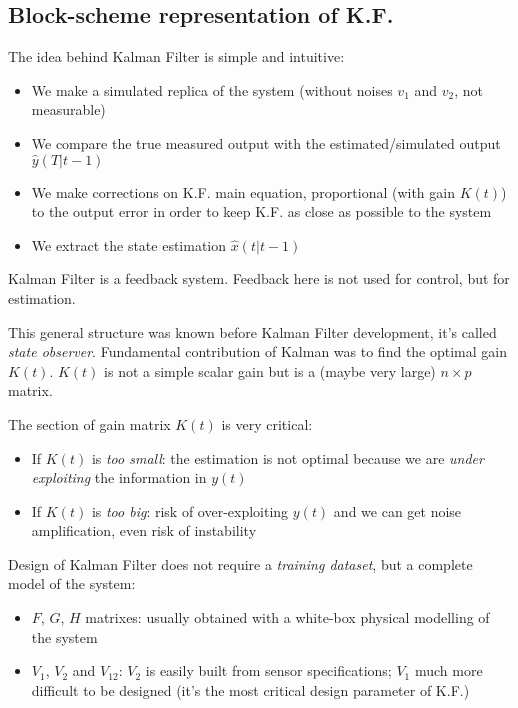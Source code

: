 
\subsection{Block-scheme representation of K.F.}

The idea behind Kalman Filter is simple and intuitive:
\begin{itemize}
    \item We make a simulated replica of the system (without noises $v_1$ and $v_2$, not measurable)
    \item We compare the true measured output with the estimated/simulated output $\hat{y}(T|t-1)$
    \item We make corrections on K.F. main equation, proportional (with gain $K(t)$) to the output error in order to keep K.F. as close as possible to the system
    \item We extract the state estimation $\hat{x}(t|t-1)$
\end{itemize}

Kalman Filter is a feedback system.
Feedback here is not used for control, but for estimation.

This general structure was known before Kalman Filter development, it's called \emph{state observer}.
Fundamental contribution of Kalman was to find the optimal gain $K(t)$.
$K(t)$ is not a simple scalar gain but is a (maybe very large) $n\times p$ matrix.

The section of gain matrix $K(t)$ is very critical:
\begin{itemize}
    \item If $K(t)$ is \emph{too small}: the estimation is not optimal because we are \emph{under exploiting} the information in $y(t)$
    \item If $K(t)$ is \emph{too big}: risk of over-exploiting $y(t)$ and we can get noise amplification, even risk of instability
\end{itemize}

Design of Kalman Filter does not require a \emph{training dataset}, but a complete model of the system:
\begin{itemize}
    \item $F$, $G$, $H$ matrixes: usually obtained with a white-box physical modelling of the system
    \item $V_1$, $V_2$ and $V_{12}$: $V_2$ is easily built from sensor specifications; $V_1$ much more difficult to be designed (it's the most critical design parameter of K.F.)
\end{itemize}

